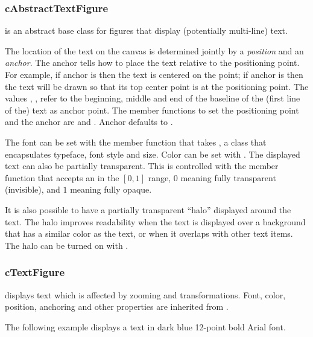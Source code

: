 \subsubsection{cAbstractTextFigure}
\label{sec:graphics:abstracttextfigure}

 is an abstract base class for figures that
display (potentially multi-line) text.

The location of the text on the canvas is determined jointly by a
\textit{position} and an \textit{anchor}. The anchor tells how to
place the text relative to the positioning point. For example,
if anchor is  then the text is centered on the point;
if anchor is  then the text will be drawn so that its top
center point is at the positioning point. The values
, ,
 refer to the beginning, middle and end of the
baseline of the (first line of the) text as anchor point. The member
functions to set the positioning point and the anchor are
 and . Anchor defaults to
.

The font can be set with the  member function that takes
, a class that encapsulates typeface, font style and
size. Color can be set with . The displayed text can
also be partially transparent. This is controlled with the 
member function that accepts an  in the $[0,1]$ range, $0$ meaning
fully transparent (invisible), and $1$ meaning fully opaque. 

It is also possible to have a partially transparent ``halo'' displayed around
the text. The halo improves readability when the text is displayed over a
background that has a similar color as the text, or when it overlaps with other
text items. The halo can be turned on with . 


\subsubsection{cTextFigure}
\label{sec:graphics:textfigure}

 displays text which is affected by zooming and
transformations. Font, color, position, anchoring and other properties are
inherited from .

The following example displays a text in dark blue 12-point bold Arial
font.

